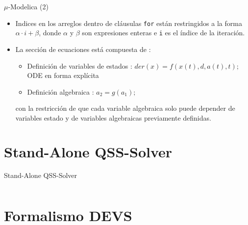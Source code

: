 \documentclass{beamer}
\begin{document}
\begin{frame}{$\mu$-Modelica (2)}
\begin{itemize}
	\item<1-> Indices en los arreglos dentro de cláusulas \texttt{for} están restringidos a la forma $\alpha \cdot i + \beta$, donde $\alpha$ y $\beta$ son expresiones enteras e \texttt{i} es el índice de la iteración.
	 \item<2-> La sección de ecuaciones está compuesta de :
	 \begin{itemize}
		\item Definición de variables de estados : $der(x) =  f (x(t), d, a(t), t);$ ODE en forma explícita
		\item Definición algebraica : $a_2  = g(a_1);$
	 \end{itemize}
	 con la restricción de que cada variable algebraica solo puede depender de variables estado y de variables algebraicas previamente definidas.
\end{itemize}
\end{frame}


\section{Stand-Alone QSS-Solver}
\begin{frame}[shrink=20]{Stand-Alone QSS-Solver}
	\inputminted[linenos]{modelica}{src/lotka_volterra_qss.mo}
\end{frame}


\section{Formalismo DEVS}
\end{document}
